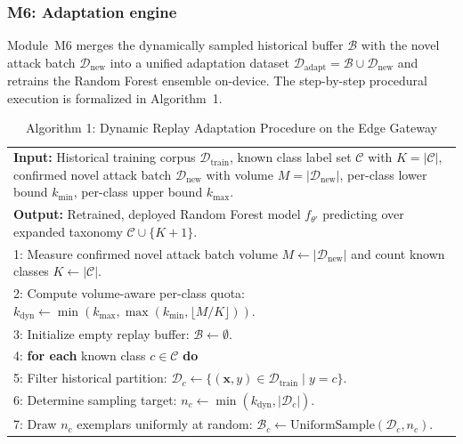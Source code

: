 \subsubsection{M6: Adaptation engine}
\label{subsubsec:m6_adaptation_engine}
Module~M6 merges the dynamically sampled historical buffer $\mathcal{B}$ with the novel attack batch $\mathcal{D}_{\text{new}}$ into a unified adaptation dataset $\mathcal{D}_{\text{adapt}} = \mathcal{B} \cup \mathcal{D}_{\text{new}}$ and retrains the Random Forest ensemble on-device. The step-by-step procedural execution is formalized in Algorithm~1.

\begin{table}[htpb]
\centering
\small
\renewcommand{\arraystretch}{1.35}
\caption{Algorithm 1: Dynamic Replay Adaptation Procedure on the Edge Gateway}
\label{alg:dynamic_replay_pw}
\begin{tabular}{|p{13.5cm}|}
\hline
\textbf{Input:} Historical training corpus $\mathcal{D}_{\text{train}}$, known class label set $\mathcal{C}$ with $K = |\mathcal{C}|$, confirmed novel attack batch $\mathcal{D}_{\text{new}}$ with volume $M = |\mathcal{D}_{\text{new}}|$, per-class lower bound $k_{\min}$, per-class upper bound $k_{\max}$. \\
\textbf{Output:} Retrained, deployed Random Forest model $f_{\theta'}$ predicting over expanded taxonomy $\mathcal{C} \cup \{K+1\}$. \\ \hline
1: Measure confirmed novel attack batch volume $M \leftarrow |\mathcal{D}_{\text{new}}|$ and count known classes $K \leftarrow |\mathcal{C}|$. \\
2: Compute volume-aware per-class quota: $k_{\text{dyn}} \leftarrow \min\!\left(k_{\max}, \max\!\left(k_{\min}, \lfloor M/K \rfloor\right)\right)$. \\
3: Initialize empty replay buffer: $\mathcal{B} \leftarrow \emptyset$. \\
4: \textbf{for each} known class $c \in \mathcal{C}$ \textbf{do} \\
5: \hspace{0.5cm} Filter historical partition: $\mathcal{D}_c \leftarrow \{(\mathbf{x}, y) \in \mathcal{D}_{\text{train}} \mid y = c\}$. \\
6: \hspace{0.5cm} Determine sampling target: $n_c \leftarrow \min(k_{\text{dyn}}, |\mathcal{D}_c|)$. \\
7: \hspace{0.5cm} Draw $n_c$ exemplars uniformly at random: $\mathcal{B}_c \leftarrow \text{UniformSample}(\mathcal{D}_c, n_c)$. \\

\end{tabular}
\end{table}
